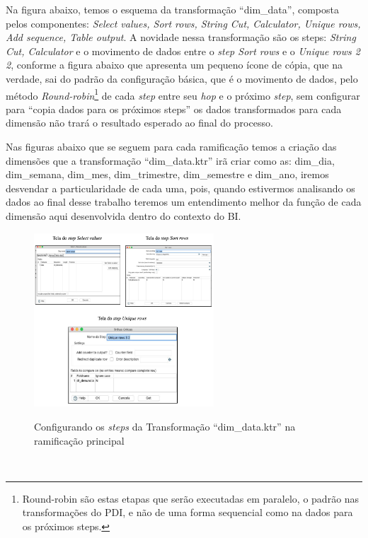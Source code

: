 Na figura abaixo, temos o esquema da transforma\c{c}\~{a}o ``dim\_data'', composta pelos componentes: 
\textit{Select values, Sort rows, String Cut, Calculator, Unique rows, Add sequence, Table output}. 
A novidade nessa transforma\c{c}\~{a}o s\~{a}o os steps: \textit{String Cut, Calculator} e o movimento de dados 
entre o \textit{step Sort rows} e o \textit{Unique rows 2 2}, conforme a figura abaixo que apresenta um 
pequeno \'{i}cone de c\'{o}pia, que na verdade, sai do padr\~{a}o da configura\c{c}\~{a}o b\'{a}sica, que \'{e} o movimento
de dados, pelo m\'{e}todo \textit{Round-robin}\footnote{Round-robin s\~{a}o estas etapas que ser\~{a}o 
executadas em paralelo, o padr\~{a}o nas transforma\c{c}ões do PDI, e n\~{a}o de uma forma sequencial como na dados para os pr\'{o}ximos steps. 
} de cada \textit{step} entre seu \textit{hop} e o pr\'{o}ximo \textit{step}, sem configurar para ``copia dados para os pr\'{o}ximos steps'' 
os dados transformados para cada dimens\~{a}o n\~{a}o trar\'{a} o resultado esperado ao final do processo.

Nas figuras abaixo que se seguem para cada ramifica\c{c}\~{a}o temos a cria\c{c}\~{a}o das dimensões que a transforma\c{c}\~{a}o 
``dim\_data.ktr'' ir\~{a} criar como as: dim\_dia, dim\_semana, dim\_mes, dim\_trimestre, 
dim\_semestre e dim\_ano, iremos desvendar a particularidade de cada uma, 
pois, quando estivermos analisando os dados ao final desse trabalho teremos 
um entendimento melhor da fun\c{c}\~{a}o de cada dimens\~{a}o aqui desenvolvida dentro do contexto do BI.

\begin{figure}[H]
	\vspace*{0,2cm}
    \centering
    \caption{Configurando os \textit{steps} da Transforma\c{c}\~{a}o ``dim\_data.ktr'' na ramifica\c{c}\~{a}o principal}
    \includegraphics[width=0.6\textwidth]{./04-figuras/figura-dim-data-steps.png}
    \label{fig:ilustfigdimdatasteps}
\end{figure}
\vspace*{-0,9cm}
{\raggedright {}} \\

